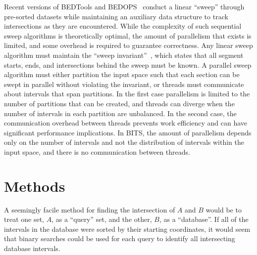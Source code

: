 \documentclass{bioinfo}
\begin{document}
Recent versions of BEDTools and BEDOPS~\citep{neph2012} conduct a
linear ``sweep'' through pre-sorted datasets while maintaining an auxiliary
data structure to track intersections as they are encountered. While the
complexity of such sequential sweep algorithms is theoretically optimal, the 
amount of parallelism that exists is limited, and some overhead is required to
guarantee correctness.  Any linear sweep algorithm must maintain the ``sweep
invariant''~\citep{mckenney2009}, which states that all segment starts, ends, 
and intersections behind the sweep must be known.  A parallel sweep algorithm
must either partition the input space such that each section can be swept in
parallel without violating the invariant, or threads must communicate 
about intervals that span partitions.  In the first case parallelism is limited
to the number of partitions that can be created, and threads can diverge when 
the number of intervals in each partition are unbalanced.  In the second case,
the communication overhead between threads prevents work efficiency and can 
have significant performance implications.  In BITS, the amount of parallelism
depends only on the number of intervals and not the distribution of intervals
within the input space, and there is no communication between threads.



\section{Methods}


A seemingly facile method for finding the intersection of $A$ and $B$ would be
to treat one set, $A$, as a ``query'' set, and the other, $B$, as a
``database''.  If all of the intervals in the database were sorted by their
starting coordinates, it would seem that binary searches could be used for each
query to identify all intersecting database intervals. 
\end{document}
